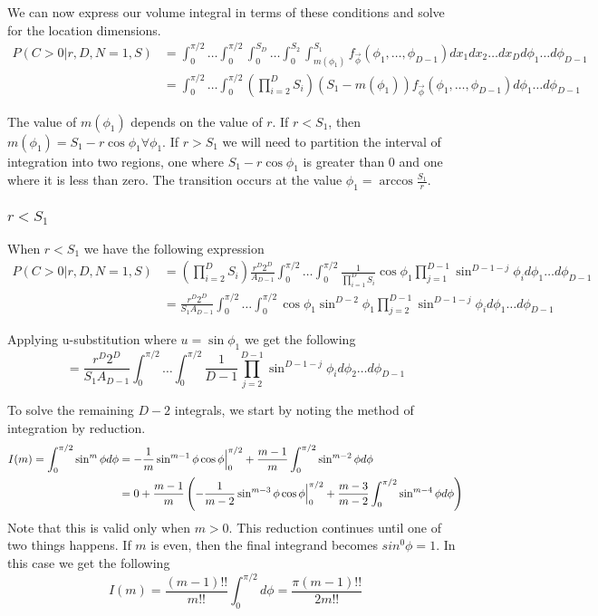 \documentclass{article}
\begin{document}
We can now express our volume integral in terms of these conditions and solve for the location dimensions.
\begin{align} \label{eq:volume integral}
	P(C>0|r, D, N=1, S) &= \int_0^{\pi/2} \hdots \int_0^{\pi/2} \int_0^{S_D} \hdots \int_0^{S_2} \int_{m(\phi_1)}^{S_1} f_{\vec\phi}(\phi_1,\hdots,\phi_{D-1})dx_1 dx_2 \hdots dx_D d\phi_1 \hdots d\phi_{D-1}\\
	&= \int_0^{\pi/2} \hdots \int_0^{\pi/2}\left(\prod_{i=2}^DS_i\right)\left(S_1-m(\phi_1)\right)  f_{\vec\phi}(\phi_1,\hdots,\phi_{D-1}) d\phi_1\hdots d\phi_{D-1}
\end{align}

The value of $m(\phi_1)$ depends on the value of $r$. If $r<S_1$, then $m(\phi_1)=S_1-r\cos \phi_1 \forall \phi_1$. If $r>S_1$ we will need to partition the interval of integration into
two regions, one where $S_1-r\cos{\phi_1}$ is greater than 0 and one where it is less than zero. The transition occurs at the value $\phi_1 = \arccos{\frac{S_1}{r}}$.

\subsubsection{$r<S_1$}
When $r<S_1$ we have the following expression
\begin{align}
	P(C>0|r, D, N=1, S) &= \left(\prod_{i=2}^DS_i\right)\frac{r^D 2^D}{A_{D-1}}\int_0^{\pi/2} \hdots \int_0^{\pi/2}\frac{1}{\prod_{i=1}^D S_i} \cos\phi_1 \prod_{j=1}^{D-1}\sin^{D-1-j}\phi_i d\phi_1\hdots d\phi_{D-1}\\
	&= \frac{r^D 2^D}{S_1 A_{D-1}}\int_0^{\pi/2} \hdots \int_0^{\pi/2} \cos\phi_1\sin^{D-2}\phi_1 \prod_{j=2}^{D-1}\sin^{D-1-j}\phi_i d\phi_1\hdots d\phi_{D-1}
\end{align}

Applying u-substitution where $u=\sin\phi_1$ we get the following
\begin{equation} \label{eq:final phi integral}
	= \frac{r^D 2^D}{S_1 A_{D-1}}\int_0^{\pi/2} \hdots \int_0^{\pi/2} \frac{1}{D-1} \prod_{j=2}^{D-1}\sin^{D-1-j}\phi_i d\phi_2\hdots d\phi_{D-1}
\end{equation}

To solve the remaining $D-2$ integrals, we start by noting the method of integration by reduction.
\begin{align}
	I(m) = \int_0^{\pi/2} \sin^m \phi d\phi &= -\frac{1}{m}\sin^{m-1}\phi \cos\phi \Big{|}_0^{\pi/2} + \frac{m-1}{m}\int_0^{\pi/2}\sin^{m-2}\phi d\phi\\
	&= 0 + \frac{m-1}{m}\left(-\frac{1}{m-2}\sin^{m-3}\phi \cos\phi \Big{|}_0^{\pi/2} + \frac{m-3}{m-2}\int_0^{\pi/2}\sin^{m-4}\phi d\phi\right)
\end{align}
Note that this is valid only when $m>0$. This reduction continues until one of two things happens. If $m$ is even, then the final integrand becomes $sin^0\phi = 1$. 
In this case we get the following
\begin{equation} \label{eq:m even}
	I(m) = \frac{(m-1)!!}{m!!}\int_0^{\pi/2} d\phi = \frac{\pi (m-1)!!}{2m!!}
\end{equation}
\end{document}
